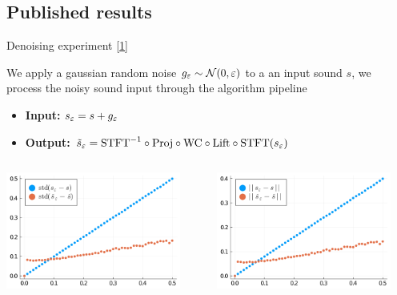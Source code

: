 \documentclass[10pt,american,ignorenonframetext,aspectratio=1610]{beamer}
\providecommand{\tightlist}{%
  \setlength{\itemsep}{0pt}\setlength{\parskip}{0pt}}
\theoremstyle{remark}
\begin{document}
\hypertarget{published-results}{%
\subsection{Published results}\label{published-results}}

\begin{frame}{Denoising experiment
{[}\protect\hyperlink{ref-asswad2021}{1}{]}}
\protect\hypertarget{denoising-experiment-asswad2021}{}

We apply a gaussian random noise \(g_\varepsilon\sim\mathcal{N}(0,\varepsilon)\) to a an input
sound \(s\), we process the noisy sound input through the algorithm
pipeline

\begin{itemize}
\tightlist
\item
  \textbf{Input:} \(s_\varepsilon = s + g_\varepsilon\)
\item
  \textbf{Output:}
  \(\tilde s_\varepsilon=\mathrm{STFT}^{-1}\circ\mathrm{Proj}\circ\mathrm{WC}\circ\mathrm{Lift}\circ\mathrm{STFT}(s_\varepsilon)\)
\end{itemize}

\begin{columns}[T]
\begin{column}{0.5\textwidth}
\includegraphics[width=0.9\textwidth,height=\textheight]{img/std_diff.png}
\end{column}

\begin{column}{0.5\textwidth}
\includegraphics[width=0.9\textwidth,height=\textheight]{img/norm_diff.png}
\end{column}
\end{columns}


\end{frame}
\end{document}
